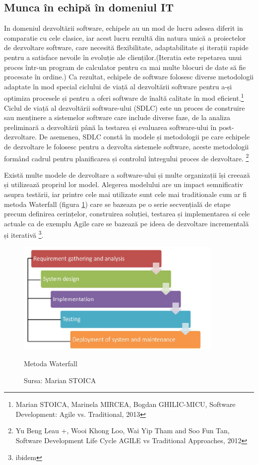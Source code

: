 \documentclass[a4paper, 12pt]{article}
\begin{document}
	\subsection{Munca în echipă în domeniul IT}

		\quad\quad In domeniul dezvoltării software, echipele au un mod de lucru adesea diferit in comparatie cu cele clasice, iar acest lucru rezultă din natura unică a proiectelor de dezvoltare software, care necesită flexibilitate, adaptabilitate și iterații rapide pentru a satisface nevoile în evoluție ale clienților.(Iteratia este  repetarea unui proces într-un program de calculator pentru ca mai multe blocuri de date să fie procesate în ordine.) Ca rezultat, echipele de software folosesc diverse metodologii adaptate în mod special ciclului de viață al dezvoltării software pentru a-și optimiza procesele și pentru a oferi software de înaltă calitate în mod eficient.\footnote{ Marian STOICA, Marinela MIRCEA, Bogdan GHILIC-MICU, Software Development: Agile vs. Traditional, 2013} Ciclul de viață al dezvoltării software-ului (SDLC) este un proces de construire sau menținere a sistemelor software care  include diverse faze, de la analiza preliminară a dezvoltării până la testarea și evaluarea software-ului în post-dezvoltare. De asemenea, SDLC constă în modele și metodologii pe care echipele de dezvoltare le folosesc pentru a dezvolta sistemele software, aceste metodologii formând cadrul pentru planificarea și controlul întregului proces de dezvoltare. \footnote{Yu Beng Leau +, Wooi Khong Loo, Wai Yip Tham and Soo Fun Tan, Software Development Life Cycle AGILE vs Traditional Approaches, 2012}

	\quad\quad Există multe modele de dezvoltare a software-ului și multe organizații își creează și utilizează propriul lor model. Alegerea modelului are un impact semnificativ asupra testării, iar printre cele mai utilizate sunt cele mai traditionale cum ar fi metoda Waterfall (figura \ref{fig:one}) care se bazeaza pe o serie secvențială de etape precum definirea cerințelor, construirea soluției, testarea și implementarea si cele actuale ca de exemplu Agile care se bazează pe ideea de dezvoltare incrementală și iterativă \footnote{ibidem}.

\begin{figure}[!htb]
			\centering
			\includegraphics[width=10cm, height=5 cm]{"figures/waterfall.png"}
			\caption {Metoda Waterfall}\label{fig:one}
			\caption*{Sursa: Marian STOICA }
		\end{figure}
\end{document}
